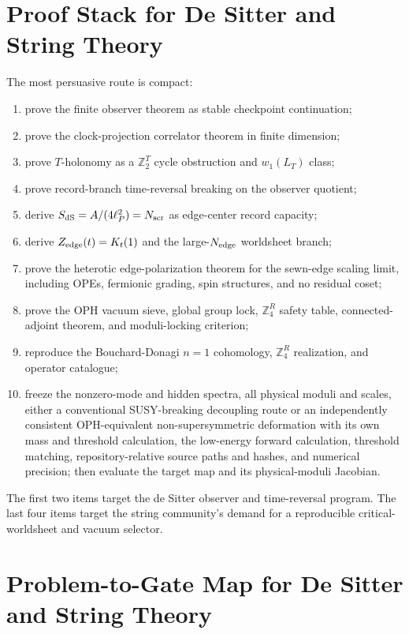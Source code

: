 \documentclass[11pt]{article}
\theoremstyle{remark}
\theoremstyle{plain}
\newcommand{\Z}{\mathbb Z}
\newcommand{\ZfourR}{\mathbb Z_4^R}
\begin{document}
\section{Proof Stack for De Sitter and String Theory}

The most persuasive route is compact:
\begin{enumerate}[leftmargin=2em]
\item prove the finite observer theorem as stable checkpoint continuation;
\item prove the clock-projection correlator theorem in finite dimension;
\item prove \(T\)-holonomy as a \(\Z_2^T\) cycle obstruction and \(w_1(L_T)\) class;
\item prove record-branch time-reversal breaking on the observer quotient;
\item derive \(S_{\rm dS}=A/(4\ell_P^2)=N_{\rm scr}\) as edge-center record capacity;
\item derive \(Z_{\rm edge}(t)=K_t(1)\) and the large-\(N_{\rm edge}\) worldsheet branch;
\item prove the heterotic edge-polarization theorem for the sewn-edge scaling limit, including
OPEs, fermionic grading, spin structures, and no residual coset;
\item prove the OPH vacuum sieve, global group lock, \(\ZfourR\) safety table, connected-adjoint
theorem, and moduli-locking criterion;
\item reproduce the Bouchard-Donagi \(n=1\) cohomology, \(\ZfourR\) realization, and operator
catalogue;
\item freeze the nonzero-mode and hidden spectra, all physical moduli and scales, either a
conventional SUSY-breaking decoupling route or an independently consistent OPH-equivalent
non-supersymmetric deformation with its own mass and threshold calculation, the low-energy forward calculation, threshold matching,
repository-relative source paths and hashes, and numerical precision; then evaluate the target
map and its physical-moduli Jacobian.
\end{enumerate}

The first two items target the de Sitter observer and time-reversal program. The last four items
target the string community's demand for a reproducible critical-worldsheet and vacuum selector.


\section{Problem-to-Gate Map for De Sitter and String Theory}
\end{document}
